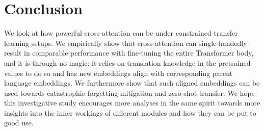 \section{Conclusion}

We look at how powerful cross-attention can be under constrained transfer learning setups. We empirically show that cross-attention can single-handedly result in comparable performance with fine-tuning the entire Transformer body, and it is through no magic: it relies on translation knowledge in the pretrained values to do so and has new embeddings align with corresponding parent language embeddings. We furthermore show that such aligned embeddings can be used towards catastrophic forgetting mitigation and zero-shot transfer. We hope this investigative study encourages more analyses in the same spirit towards more insights into the inner workings of different modules and how they can be put to good use.


